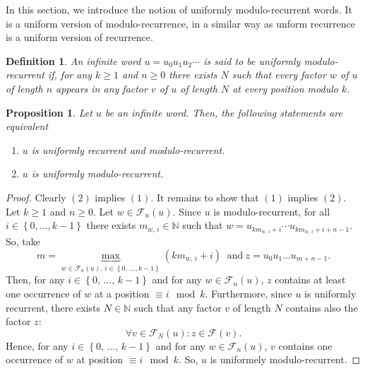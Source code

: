 \documentclass[a4 paper,12pt]{article}
\newtheorem{definition}{Definition}[section]
\newtheorem{proposition}{Proposition}[section]
\newcommand{\N}{\mathbb{N}}
\begin{document}
In this section, we introduce the notion of uniformly modulo-recurrent words. It is a uniform version of modulo-recurrence, in a  similar way as unform recurrence  is a uniform version of recurrence.


\begin{definition} An infinite word $u=u_0u_1u_2\cdots$ is said to be uniformly modulo-recurrent if, for any $k\geq1$ and $n\geq 0$ there exists $N$ such that every factor $w$ of $u$ of length $n$  appears in any factor $v$ of $u$ of length $N$ at every position modulo $k$.

\end{definition}

\begin{proposition} Let $u$ be an infinite word. Then, the following statements are equivalent

\begin{enumerate}
	\item  $u$ is  uniformly recurrent and modulo-recurrent.
	\item  $u$ is uniformly modulo-recurrent.
\end{enumerate}
\end{proposition}

\begin{proof}
Clearly $(2)$ implies $(1)$. It remains to show that $(1)$ implies $(2)$. Let $k\geq 1$ and $n\geq 0$. Let $w\in \mathcal{F}_n(u)$. Since $u$ is modulo-recurrent, for all $i\in\left\{0,\ldots, k-1\right\}$ there exists $m_{w,\,i}\in \mathbb{N}$ such that $w=u_{km_{w,\,i}+i} \cdots u_{km_{w,\,i}+i+n-1}.$
 So,  take
  $$m=\underbrace{\max}_{w\in \mathcal{F}_{n}(u),\, i\in\left\{0,\,\ldots, k-1\right\}}(km_{w,\,i}+i)\  \textrm{ and}\ z=u_0u_1\ldots u_{m+n-1}.$$
  Then, for any $i\in\left\{0,\, \ldots,\, k-1\right\}$ and for any $w\in\mathcal{F}_n(u)$, $z$ contains at least one occurrence of $w$ at a position $\equiv i\mod k$. Furthermore, since $u$ is uniformly recurrent, there exists $N\in\mathbb{N}$ such that any factor $v$ of length $N$ contains also the factor $z$:
$$\forall v\in\mathcal{F}_N(u): z\in \mathcal{F}(v).$$
Hence, for any $i\in\left\{0,\, \ldots,\, k-1\right\}$ and for any $w\in\mathcal{F}_n(u)$, $v$ contains one occurrence of $w$ at position $\equiv i\mod k$. So,  $u$ is uniformely modulo-recurrent. \end{proof}
\end{document}

